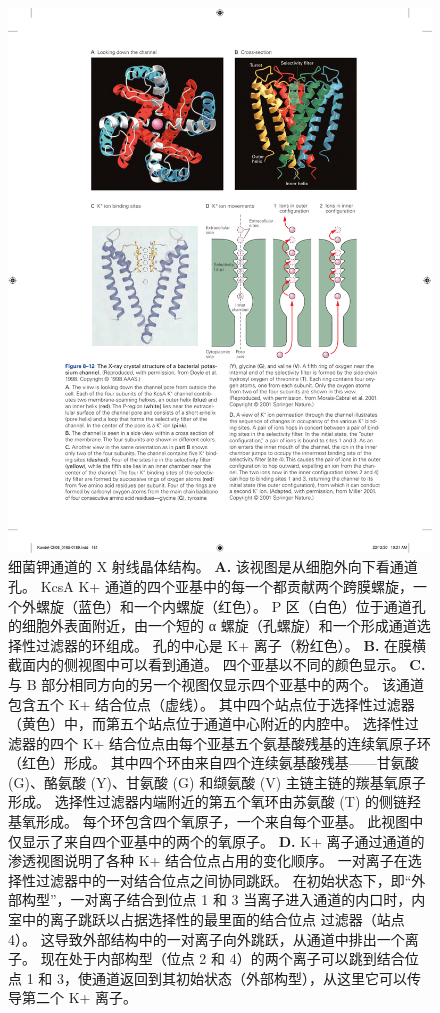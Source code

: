 \begin{figure}[htbp]
	\centering
	\includegraphics[width=0.7\linewidth]{chap08/fig_8_12}
	\caption{细菌钾通道的 X 射线晶体结构\cite{doyle1998structure}。
		\textbf{A.} 该视图是从细胞外向下看通道孔。
		KcsA K+ 通道的四个亚基中的每一个都贡献两个跨膜螺旋，一个外螺旋（蓝色）和一个内螺旋（红色）。
		P 区（白色）位于通道孔的细胞外表面附近，由一个短的 α 螺旋（孔螺旋）和一个形成通道选择性过滤器的环组成。
		孔的中心是 K+ 离子（粉红色）。
		\textbf{B.} 在膜横截面内的侧视图中可以看到通道。 四个亚基以不同的颜色显示。
		\textbf{C.} 与 B 部分相同方向的另一个视图仅显示四个亚基中的两个。
		该通道包含五个 K+ 结合位点（虚线）。
		其中四个站点位于选择性过滤器（黄色）中，而第五个站点位于通道中心附近的内腔中。
		选择性过滤器的四个 K+ 结合位点由每个亚基五个氨基酸残基的连续氧原子环（红色）形成。
		其中四个环由来自四个连续氨基酸残基——甘氨酸 (G)、酪氨酸 (Y)、甘氨酸 (G) 和缬氨酸 (V) 主链主链的羰基氧原子形成。
		选择性过滤器内端附近的第五个氧环由苏氨酸 (T) 的侧链羟基氧形成。
		每个环包含四个氧原子，一个来自每个亚基。
		此视图中仅显示了来自四个亚基中的两个的氧原子\cite{morais2001energetic}。
		\textbf{D.} K+ 离子通过通道的渗透视图说明了各种 K+ 结合位点占用的变化顺序。
		一对离子在选择性过滤器中的一对结合位点之间协同跳跃。
		在初始状态下，即“外部构型”，一对离子结合到位点 1 和 3
		当离子进入通道的内口时，内室中的离子跳跃以占据选择性的最里面的结合位点 过滤器（站点 4）。
		这导致外部结构中的一对离子向外跳跃，从通道中排出一个离子。
		现在处于内部构型（位点 2 和 4）的两个离子可以跳到结合位点 1 和 3，使通道返回到其初始状态（外部构型），从这里它可以传导第二个 K+ 离子\cite{miller2001see}。}
	\label{fig:8_12}
\end{figure}


